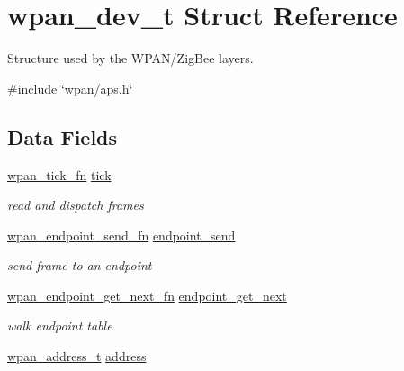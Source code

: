 \hypertarget{structwpan__dev__t}{\section{wpan\-\_\-dev\-\_\-t Struct Reference}
\label{structwpan__dev__t}
}


Structure used by the W\-P\-A\-N/\-Zig\-Bee layers.  




{\ttfamily \#include \char`\"{}wpan/aps.\-h\char`\"{}}

\subsection*{Data Fields}
\begin{DoxyCompactItemize}
\item 
\hypertarget{group__wpan__aps_gab472632c6a95d7856d1ea137441ec6a2}{\hyperlink{group__wpan__aps_gaf47f19bd0615a2edf5ec38e7025fdc35}{wpan\-\_\-tick\-\_\-fn} \hyperlink{group__wpan__aps_gab472632c6a95d7856d1ea137441ec6a2}{tick}}\label{group__wpan__aps_gab472632c6a95d7856d1ea137441ec6a2}

\begin{DoxyCompactList}\small\item\em read and dispatch frames \end{DoxyCompactList}\item 
\hypertarget{group__wpan__aps_ga363ce09a97ec0b7a2dbff5b815fc3fbc}{\hyperlink{group__wpan__aps_ga66b2c3b27a4e56cd04ba2f70841e2646}{wpan\-\_\-endpoint\-\_\-send\-\_\-fn} \hyperlink{group__wpan__aps_ga363ce09a97ec0b7a2dbff5b815fc3fbc}{endpoint\-\_\-send}}\label{group__wpan__aps_ga363ce09a97ec0b7a2dbff5b815fc3fbc}

\begin{DoxyCompactList}\small\item\em send frame to an endpoint \end{DoxyCompactList}\item 
\hypertarget{group__wpan__aps_ga249b57f4a0559c0adb038f68d9b5c443}{\hyperlink{group__wpan__aps_ga2f83e173b0da6f1d3c161d93653681b5}{wpan\-\_\-endpoint\-\_\-get\-\_\-next\-\_\-fn} \hyperlink{group__wpan__aps_ga249b57f4a0559c0adb038f68d9b5c443}{endpoint\-\_\-get\-\_\-next}}\label{group__wpan__aps_ga249b57f4a0559c0adb038f68d9b5c443}

\begin{DoxyCompactList}\small\item\em walk endpoint table \end{DoxyCompactList}\item 
\hypertarget{group__wpan__aps_ga66a58a737aee9733019399e2eceabf4a}{\hyperlink{structwpan__address__t}{wpan\-\_\-address\-\_\-t} \hyperlink{group__wpan__aps_ga66a58a737aee9733019399e2eceabf4a}{address}}\label{group__wpan__aps_ga66a58a737aee9733019399e2eceabf4a}


\end{DoxyCompactItemize}
